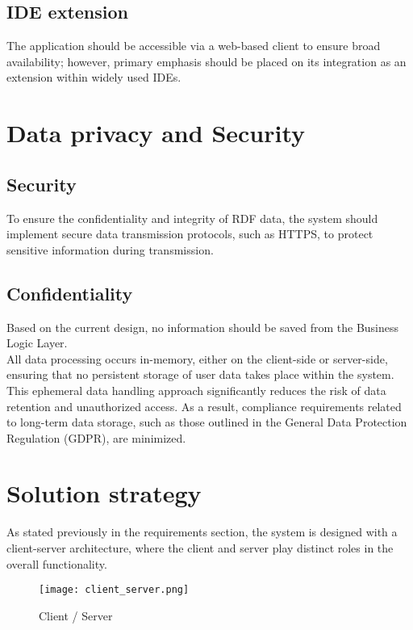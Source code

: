 \subsection{IDE extension\label{sec:reqsuba}}
The application should be accessible via a web-based client to ensure broad availability; however, primary emphasis should be placed on its integration as an extension within widely used IDEs. 

\section{Data privacy and Security\label{sec:techreq}}
\subsection{Security\label{sec:reqsuba}}
To ensure the confidentiality and integrity of RDF data, the system should implement secure data transmission protocols, such as HTTPS, to protect sensitive information during transmission.

\subsection{Confidentiality\label{sec:reqsuba}}
Based on the current design, no information should be saved from the Business Logic Layer. 
\\
All data processing occurs in-memory, either on the client-side or server-side, ensuring that no persistent storage of user data takes place within the system. This ephemeral data handling approach significantly reduces the risk of data retention and unauthorized access. As a result, compliance requirements related to long-term data storage, such as those outlined in the General Data Protection Regulation (GDPR), are minimized. 


\section{Solution strategy\label{sec:techreq}}
As stated previously in the requirements section, the system is designed with a client-server architecture, where the client and server play distinct roles in the overall functionality.

\begin{figure}[H]
    \centering
    \texttt{[image: client\_server.png]}\\
    \caption{Client / Server}\label{fig:client_server}
  \end{figure}

